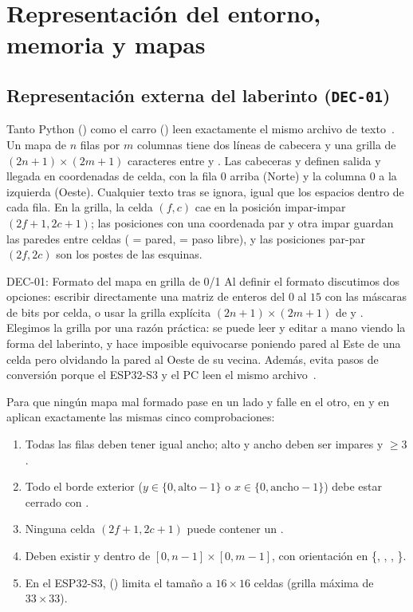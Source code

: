 \section{Representación del entorno, memoria y mapas}
\label{sec:entorno-mapas}

\subsection{Representación externa del laberinto (\texttt{DEC-01})}
\label{subsec:repr-externa}

Tanto Python () como el carro () leen exactamente el mismo archivo de texto~\cite{arquitectura2026doc}. Un mapa de $n$ filas por $m$ columnas tiene dos líneas de cabecera y una grilla de $(2n+1)\times(2m+1)$ caracteres entre  y . Las cabeceras  y  definen salida y llegada en coordenadas de celda, con la fila $0$ arriba (Norte) y la columna $0$ a la izquierda (Oeste). Cualquier texto tras \cmd{\#} se ignora, igual que los espacios dentro de cada fila. En la grilla, la celda $(f, c)$ cae en la posición impar-impar $(2f+1, 2c+1)$; las posiciones con una coordenada par y otra impar guardan las paredes entre celdas ( = pared,  = paso libre), y las posiciones par-par $(2f, 2c)$ son los postes de las esquinas.

\begin{decision}{DEC-01: Formato del mapa en grilla de 0/1}
Al definir el formato discutimos dos opciones: escribir directamente una matriz de enteros del $0$ al $15$ con las máscaras de bits por celda, o usar la grilla explícita $(2n+1)\times(2m+1)$ de  y . Elegimos la grilla por una razón práctica: se puede leer y editar a mano viendo la forma del laberinto, y hace imposible equivocarse poniendo pared al Este de una celda pero olvidando la pared al Oeste de su vecina. Además, evita pasos de conversión porque el ESP32-S3 y el PC leen el mismo archivo~\cite{arquitectura2026doc}.
\end{decision}

Para que ningún mapa mal formado pase en un lado y falle en el otro,  en  y  en  aplican exactamente las mismas cinco comprobaciones:
\begin{enumerate}[leftmargin=1.4em,nosep]
  \item Todas las filas deben tener igual ancho; alto y ancho deben ser impares y $\ge 3$.
  \item Todo el borde exterior ($y \in \{0, \text{alto}-1\}$ o $x \in \{0, \text{ancho}-1\}$) debe estar cerrado con .
  \item Ninguna celda $(2f+1, 2c+1)$ puede contener un .
  \item Deben existir  y  dentro de $[0, n-1]\times[0, m-1]$, con orientación en \{, , , \}.
  \item En el ESP32-S3,  () limita el tamaño a $16\times 16$ celdas (grilla máxima de $33\times 33$).
\end{enumerate}

